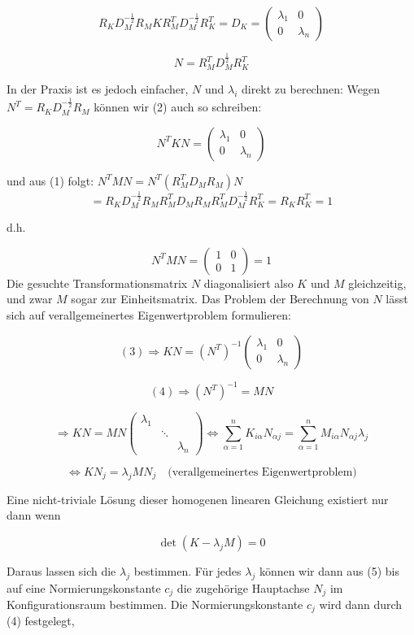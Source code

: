 \documentclass[10pt, letterpaper]{article}
\begin{document}
\[R_K D_M^{-\frac{1}{2}}R_M K R_M^T D_M^{-\frac{1}{2}}R_K^T=D_K=\begin{pmatrix}\lambda_1 & 0 \\ 0 & \lambda_n\end{pmatrix} \tag{2}\]

\[N=R_M^T D_M^{\frac{1}{2}}R_K^T\]

In der Praxis ist es jedoch einfacher, $N$ und $\lambda_i$ direkt zu berechnen:
Wegen $N^T=R_K D_M^{-\frac{1}{2}}R_M$ können wir (2) auch so schreiben:

\[N^T K N = \begin{pmatrix}\lambda_1 & 0 \\ 0 & \lambda_n\end{pmatrix} \tag{3}\]

und aus (1) folgt: $N^T M N = N^T(R_M^T D_M R_M)N$
\[= R_K D_M^{-\frac{1}{2}}R_M R_M^T D_M R_M R_M^T D_M^{-\frac{1}{2}}R_K^T = R_K R_K^T = 1\]

d.h.

\[N^T M N = \begin{pmatrix}1 & 0 \\ 0 & 1\end{pmatrix} = 1 \tag{4}\]
Die gesuchte Transformationsmatrix $N$ diagonalisiert also $K$ und $M$ gleichzeitig, und zwar $M$ sogar zur Einheitsmatrix. Das Problem der Berechnung von $N$ lässt sich auf verallgemeinertes Eigenwertproblem formulieren:

\[(3) \Rightarrow KN = (N^T)^{-1} \begin{pmatrix}\lambda_1 & 0 \\ 0 & \lambda_n\end{pmatrix}\]

\[(4) \Rightarrow (N^T)^{-1} = MN\]

\[\Rightarrow KN = MN \begin{pmatrix}\lambda_1 & & \\ & \ddots & \\ & & \lambda_n\end{pmatrix} \Leftrightarrow \sum_{\alpha=1}^n K_{i\alpha}N_{\alpha j} = \sum_{\alpha=1}^n M_{i\alpha}N_{\alpha j}\lambda_j\]

\[\Leftrightarrow KN_j = \lambda_j MN_j \tag{5} \quad \text{(verallgemeinertes Eigenwertproblem)}\]

Eine nicht-triviale Lösung dieser homogenen linearen Gleichung existiert nur dann wenn

\[\det(K-\lambda_j M) = 0 \tag{6}\]

Daraus lassen sich die $\lambda_j$ bestimmen. Für jedes $\lambda_j$ können wir dann aus (5) bis auf eine Normierungskonstante $c_j$ die zugehörige Hauptachse $N_j$ im Konfigurationsraum bestimmen. Die Normierungskonstante $c_j$ wird dann durch (4) festgelegt,
\end{document}
